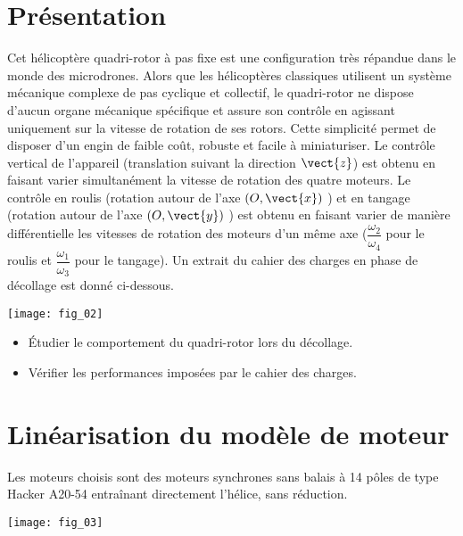 \ifprof
\else
\begin{multicols}{2}
\fi
\setcounter{numques}{0}
\section*{Présentation}
\ifprof
\else
Cet hélicoptère quadri-rotor à pas fixe est une configuration très répandue dans le monde des microdrones.
Alors que les hélicoptères classiques utilisent un système mécanique complexe de pas cyclique et
collectif, le quadri-rotor ne dispose d'aucun organe mécanique spécifique et assure son contrôle en agissant
uniquement sur la vitesse de rotation de ses rotors. Cette simplicité permet de disposer d'un engin de faible
coût, robuste et facile à miniaturiser.
Le contrôle vertical de l'appareil (translation suivant la direction $\vect{z}$) est obtenu en faisant varier
simultanément la vitesse de rotation des quatre moteurs. Le contrôle en roulis (rotation autour de l’axe $(O,\vect{x})$ ) et en tangage (rotation autour de l’axe $(O,\vect{y})$ ) est obtenu en faisant varier de manière différentielle
les vitesses de rotation des moteurs d'un même axe ($\dfrac{\omega_2}{\omega_4}$  pour le roulis et $\dfrac{\omega_1}{\omega_3}$ pour le tangage).
Un extrait du cahier des charges en phase de décollage est donné ci-dessous.


\begin{center}
\texttt{[image: fig\_02]}
\end{center}
\fi
\begin{obj}
\begin{itemize}
\item Étudier le comportement du quadri-rotor lors du décollage.
\item Vérifier les performances imposées par le cahier des charges.
\end{itemize}
\end{obj}

\section*{Linéarisation du modèle de moteur}
\ifprof
\else

Les moteurs choisis sont des moteurs synchrones sans balais à 14 pôles de type Hacker A20-54 entraînant
directement l'hélice, sans réduction.

\begin{center}
\texttt{[image: fig\_03]}
\end{center}


\end{multicols}
